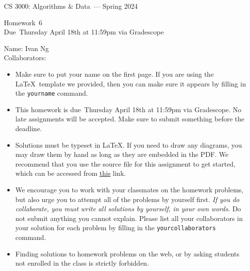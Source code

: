 \documentclass[11pt]{article}
\newcommand{\yourname}{Ivan Ng}
\newcommand{\yourcollaborators}{}
\theoremstyle{definition}
\theoremstyle{theorem}
\newcommand{\course}{CS 3000: Algorithms \& Data}
\newcommand{\semester}{Spring 2024}
\newcommand{\hwnum}{6}
\newcommand{\hwdue}{Thursday April 18th at 11:59pm via Gradescope}
\begin{document}
{\Large 
\begin{center} \course\ --- \semester\ \end{center}}
{\large
\vspace{10pt}
\noindent Homework~\hwnum \vspace{2pt}\\
Due~\hwdue}

\vspace{15pt}
\bigskip
{\large
\noindent Name: \yourname \vspace{2pt}\\ Collaborators: \yourcollaborators}

\vspace{15pt}
\begin{itemize}

\item
  Make sure to put your name on the first page.  If you are using the
  \LaTeX~template we provided, then you can make sure it appears by
  filling in the \texttt{yourname} command.

\item This homework is due~\hwdue.  No late assignments will be accepted.  Make sure to submit something before the deadline.

\item Solutions must be typeset in \LaTeX.  If you need to draw any diagrams,
  you may draw them by hand as long as they are embedded in the PDF.
  We recommend that you use the source file for this assignment to get started, which can be accessed from \href{https://www.overleaf.com/read/fqgdxsdsggcq#2ead97}{this} link.

\item We encourage you to work with your classmates on the homework
  problems, but also urge you to attempt all of the problems by
  yourself first. \emph{If you do collaborate, you must write all
    solutions by yourself, in your own words.}  Do not submit anything
  you cannot explain.  Please list all your collaborators in your
  solution for each problem by filling in the
  \texttt{yourcollaborators} command.

\item Finding solutions to homework problems on the web, or by asking
  students not enrolled in the class is strictly forbidden.

\end{itemize}
\newpage
\end{document}
